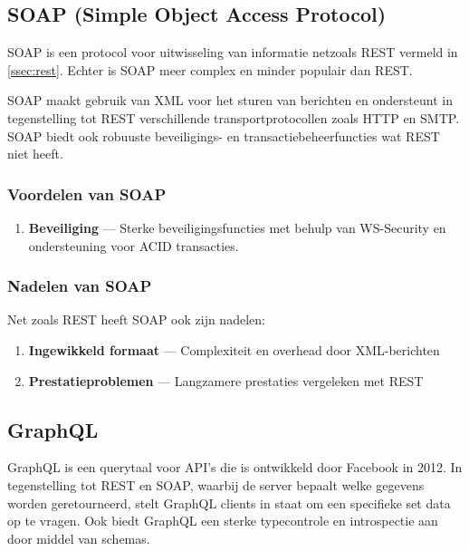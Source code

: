 \subsection{SOAP (Simple Object Access Protocol)}
SOAP is een protocol voor uitwisseling van informatie netzoals REST vermeld in
\autoref{ssec:rest}. Echter is SOAP meer complex en minder populair dan REST.

SOAP maakt gebruik van XML voor het sturen van berichten en ondersteunt
in tegenstelling tot REST verschillende transportprotocollen zoals
HTTP en SMTP. SOAP biedt ook robuuste beveiligings- en transactiebeheerfuncties
wat REST niet heeft.\cite{Śliwa_Pańczyk_2021,w3c}

\subsubsection{Voordelen van SOAP}
\begin{enumerate}
    \item \textbf{Beveiliging} --- Sterke beveiligingsfuncties met behulp van
    WS-Security en ondersteuning voor ACID transacties.
\end{enumerate}

\subsubsection{Nadelen van SOAP}
Net zoals REST heeft SOAP ook zijn nadelen:
\begin{enumerate}
    \item \textbf{Ingewikkeld formaat} --- Complexiteit en overhead door XML-berichten
    \item \textbf{Prestatieproblemen} --- Langzamere prestaties vergeleken met REST
\end{enumerate}

\subsection{GraphQL}
GraphQL is een querytaal voor API's die is ontwikkeld door Facebook in 2012\cite{facebook}.
In tegenstelling tot REST en SOAP, waarbij de server bepaalt welke gegevens
worden geretourneerd, stelt GraphQL clients in staat om een specifieke set data
op te vragen. Ook biedt GraphQL een sterke typecontrole en introspectie aan door
middel van schemas.\cite{Hartig}

